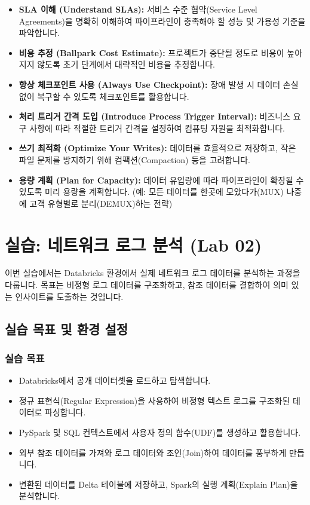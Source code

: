 \documentclass[11pt,a4paper]{article}
\theoremstyle{definition}
\begin{document}
\begin{itemize}
    \item \textbf{SLA 이해 (Understand SLAs):} 서비스 수준 협약(Service Level Agreements)을 명확히 이해하여 파이프라인이 충족해야 할 성능 및 가용성 기준을 파악합니다.
    \item \textbf{비용 추정 (Ballpark Cost Estimate):} 프로젝트가 중단될 정도로 비용이 높아지지 않도록 초기 단계에서 대략적인 비용을 추정합니다.
    \item \textbf{항상 체크포인트 사용 (Always Use Checkpoint):} 장애 발생 시 데이터 손실 없이 복구할 수 있도록 체크포인트를 활용합니다.
    \item \textbf{처리 트리거 간격 도입 (Introduce Process Trigger Interval):} 비즈니스 요구 사항에 따라 적절한 트리거 간격을 설정하여 컴퓨팅 자원을 최적화합니다.
    \item \textbf{쓰기 최적화 (Optimize Your Writes):} 데이터를 효율적으로 저장하고, 작은 파일 문제를 방지하기 위해 컴팩션(Compaction) 등을 고려합니다.
    \item \textbf{용량 계획 (Plan for Capacity):} 데이터 유입량에 따라 파이프라인이 확장될 수 있도록 미리 용량을 계획합니다. (예: 모든 데이터를 한곳에 모았다가(MUX) 나중에 고객 유형별로 분리(DEMUX)하는 전략)
\end{itemize}

\newpage

\section{실습: 네트워크 로그 분석 (Lab 02)}

이번 실습에서는 Databricks 환경에서 실제 네트워크 로그 데이터를 분석하는 과정을 다룹니다.
목표는 비정형 로그 데이터를 구조화하고, 참조 데이터를 결합하여 의미 있는 인사이트를 도출하는 것입니다.

\subsection{실습 목표 및 환경 설정}

\subsubsection{실습 목표}
\begin{itemize}
    \item Databricks에서 공개 데이터셋을 로드하고 탐색합니다.
    \item 정규 표현식(Regular Expression)을 사용하여 비정형 텍스트 로그를 구조화된 데이터로 파싱합니다.
    \item PySpark 및 SQL 컨텍스트에서 사용자 정의 함수(UDF)를 생성하고 활용합니다.
    \item 외부 참조 데이터를 가져와 로그 데이터와 조인(Join)하여 데이터를 풍부하게 만듭니다.
    \item 변환된 데이터를 Delta 테이블에 저장하고, Spark의 실행 계획(Explain Plan)을 분석합니다.
\end{itemize}
\end{document}
